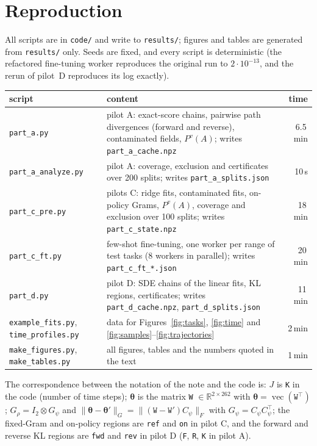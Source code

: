 \documentclass{article}
\DeclareMathOperator{\vect}{vec}
\newcommand{\RR}{\mathbb{R}}
\newcommand{\Pv}[1]{P^{#1}}                         %
\newcommand{\bth}{\boldsymbol{\theta}}
\theoremstyle{plain}
\begin{document}
\appendix
\section{Reproduction}\label{app:repro}

All scripts are in \texttt{code/} and write to \texttt{results/}; figures and tables are generated
from \texttt{results/} only. Seeds are fixed, and every script is deterministic (the refactored
fine-tuning worker reproduces the original run to $2\cdot10^{-13}$, and the rerun of pilot~D
reproduces its log exactly).

\begin{center}
\small
\begin{tabularx}{\textwidth}{l X r}
\toprule
script & content & time\\
\midrule
\texttt{part\_a.py} & pilot A: exact-score chains, pairwise path divergences (forward and reverse), contaminated fields, $\Pv{v}(A)$; writes \texttt{part\_a\_cache.npz} & 6.5\,min\\
\texttt{part\_a\_analyze.py} & pilot A: coverage, exclusion and certificates over 200 splits; writes \texttt{part\_a\_splits.json} & 10\,s\\
\texttt{part\_c\_pre.py} & pilots C: ridge fits, contaminated fits, on-policy Grams, $\Pv{v}(A)$, coverage and exclusion over 100 splits; writes \texttt{part\_c\_state.npz} & 18\,min\\
\texttt{part\_c\_ft.py} & few-shot fine-tuning, one worker per range of test tasks (8 workers in parallel); writes \texttt{part\_c\_ft\_*.json} & 20\,min\\
\texttt{part\_d.py} & pilot D: SDE chains of the linear fits, KL regions, certificates; writes \texttt{part\_d\_cache.npz}, \texttt{part\_d\_splits.json} & 11\,min\\
\texttt{example\_fits.py}, \texttt{time\_profiles.py} & data for Figures~\ref{fig:tasks}, \ref{fig:time} and \ref{fig:samples}--\ref{fig:trajectories} & 2\,min\\
\texttt{make\_figures.py}, \texttt{make\_tables.py} & all figures, tables and the numbers quoted in the text & 1\,min\\
\bottomrule
\end{tabularx}
\end{center}

\noindent The correspondence between the notation of the note and the code is: $J$ is \texttt{K}
in the code (number of time steps); $\bth$ is the matrix \texttt{W} $\in\RR^{2\times262}$ with
$\bth=\vect(\texttt{W}^\top)$; $G_\rho=I_2\otimes G_\psi$ and $\|\bth-\bth'\|_{G}=\|(\texttt{W}-\texttt{W}')C_\psi\|_F$ with
$G_\psi=C_\psi C_\psi^\top$; the fixed-Gram and on-policy regions are \texttt{ref} and \texttt{on} in pilot C,
and the forward and reverse KL regions are \texttt{fwd} and \texttt{rev} in pilot D (\texttt{F}, \texttt{R},
\texttt{K} in pilot A).



\end{document}
